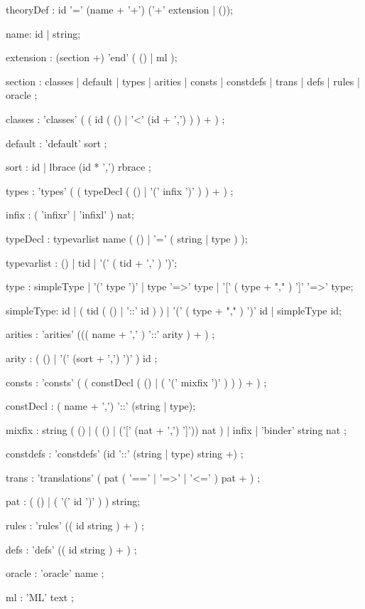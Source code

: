 \begin{rail}

theoryDef : id '=' (name + '+') ('+' extension | ());

name: id | string;

extension : (section +) 'end' ( () | ml );

section : classes
        | default
        | types
        | arities
        | consts
        | constdefs
        | trans
        | defs
        | rules
        | oracle
        ;

classes : 'classes' ( ( id (  ()
                            | '<' (id + ',')
                           ) 
                       ) + )
        ;

default : 'default' sort 
        ;

sort :  id
     | lbrace (id * ',') rbrace
     ;

types : 'types' ( ( typeDecl ( () | '(' infix ')' ) ) + )
      ;

infix : ( 'infixr' | 'infixl' ) nat;

typeDecl : typevarlist name
           ( () | '=' ( string | type ) );

typevarlist : () | tid | '(' ( tid + ',' ) ')';

type : simpleType | '(' type ')' | type '=>' type |
       '[' ( type + "," ) ']' '=>' type;

simpleType: id | ( tid ( () | '::' id ) ) |
            '(' ( type + "," ) ')' id | simpleType id;


arities : 'arities' ((( name + ',' ) '::' arity ) + )
        ;

arity   : ( () 
          | '(' (sort + ',') ')' 
          ) id
        ;


consts : 'consts' ( ( constDecl ( () | ( '(' mixfix ')' ) ) ) + )
       ;

constDecl : ( name + ',') '::' (string | type);

mixfix :  string ( () | ( () | ('[' (nat + ',') ']')) nat )
       | infix
       | 'binder' string nat ;

constdefs : 'constdefs' (id '::' (string | type) string +)
          ;

trans : 'translations' ( pat ( '==' | '=>' | '<=' ) pat + )
      ;

pat : ( () | ( '(' id ')' ) ) string;

rules : 'rules' (( id string ) + )
      ;

defs : 'defs' (( id string ) + )
     ;

oracle : 'oracle' name
       ;

ml : 'ML' text
   ;

\end{rail}
